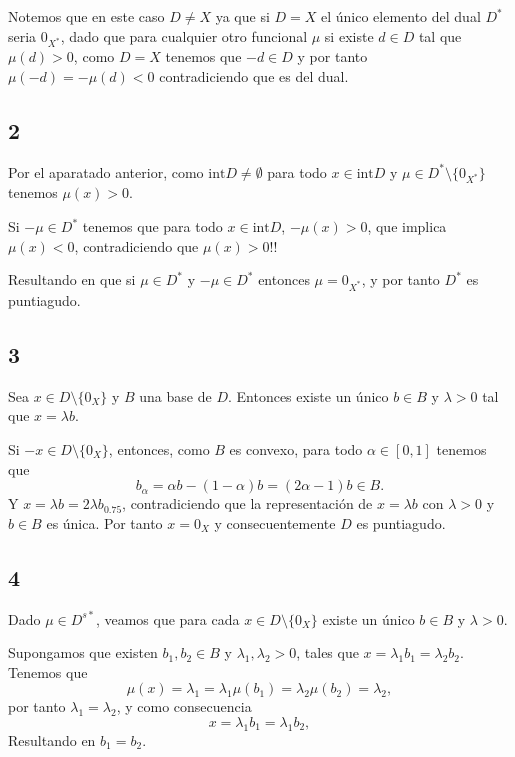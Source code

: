 Notemos que en este caso $D \neq X$ ya que si $D = X$ el único elemento del dual $D^*$ seria $0_{X^*}$,
dado que para cualquier otro funcional $\mu$ si existe $d \in D$ tal que $\mu(d) > 0$,
como $D = X$ tenemos que $-d \in D$ y por tanto $\mu(-d) = - \mu(d) < 0$ contradiciendo que es del dual.

\subsection*{2}

Por el aparatado anterior,
como $\text{int} D \neq \emptyset$ para todo $x \in \text{int}D$ y $\mu \in D^* \setminus \{ 0_{X^*} \}$ tenemos $\mu(x) > 0$.

Si $-\mu \in D^*$ tenemos que para todo $x \in \text{int}D$, $-\mu(x) > 0$,
que implica $\mu(x) < 0$, contradiciendo que $\mu(x) > 0$!!

Resultando en que si $\mu \in D^*$ y $-\mu \in D^*$ entonces $\mu = 0_{X^*}$,
y por tanto $D^*$ es puntiagudo.

\subsection*{3}

Sea $x \in D \setminus \{ 0_X \}$ y $B$ una base de $D$.
Entonces existe un único $b \in B$ y $\lambda > 0$ tal que $x = \lambda b$.

Si $-x \in D \setminus \{ 0_X \}$,
entonces, como $B$ es convexo,
para todo $\alpha \in [0, 1]$ tenemos que
\begin{equation*}
    b_\alpha = \alpha b - (1 - \alpha) b = (2 \alpha - 1) b \in B.
\end{equation*}
Y $x = \lambda b = 2 \lambda b_{0.75}$,
contradiciendo que la representación de $x = \lambda b$ con $\lambda > 0$ y $b \in B$ es única.
Por tanto $x = 0_X$ y consecuentemente $D$ es puntiagudo.

\subsection*{4}

Dado $\mu \in D^{s*}$,
veamos que para cada $x \in D \setminus \{ 0_X \}$ existe un único $b \in B$ y $\lambda > 0$.

Supongamos que existen $b_1, b_2 \in B$ y $\lambda_1, \lambda_2 > 0$,
tales que $x = \lambda_1 b_1 = \lambda_2 b_2$.
Tenemos que
\begin{equation*}
    \mu(x) = \lambda_1 = \lambda_1 \mu(b_1) = \lambda_2 \mu(b_2) = \lambda_2,
\end{equation*}
por tanto $\lambda_1 = \lambda_2$, y como consecuencia
\begin{equation*}
    x = \lambda_1 b_1 = \lambda_1 b_2,
\end{equation*}
Resultando en $b_1 = b_2$.

